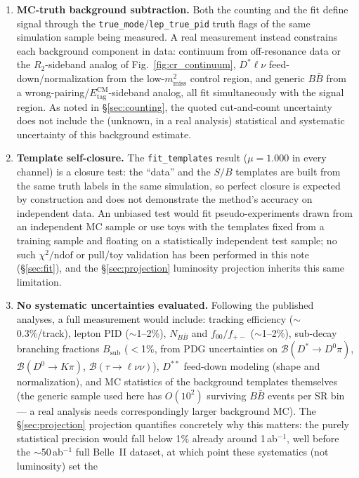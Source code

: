 \documentclass[11pt]{article}
\newcommand{\mmiss}{m^2_{\mathrm{miss}}}
\newcommand{\BF}{\mathcal{B}}
\newcommand{\Etag}{E_{\mathrm{tag}}^{\mathrm{CM}}}
\begin{document}
\begin{enumerate}
\item \textbf{MC-truth background subtraction.} Both the counting and the
  fit define signal through the
  \texttt{true\_mode}/\texttt{lep\_true\_pid} truth flags of the same
  simulation sample being measured. A real measurement instead constrains
  each background component in data: continuum from off-resonance data or
  the $R_2$-sideband analog of Fig.~\ref{fig:cr_continuum},
  $D^{*}\ell\nu$ feed-down/normalization from the low-$\mmiss$ control
  region, and generic $B\bar B$ from a wrong-pairing/$\Etag$-sideband
  analog, all fit simultaneously with the signal region. As noted in
  \S\ref{sec:counting}, the quoted cut-and-count uncertainty does not
  include the (unknown, in a real analysis) statistical and systematic
  uncertainty of this background estimate.
\item \textbf{Template self-closure.} The \texttt{fit\_templates} result
  ($\mu = 1.000$ in every channel) is a closure test: the ``data'' and
  the $S/B$ templates are built from the same truth labels in the same
  simulation, so perfect closure is expected by construction and does not
  demonstrate the method's accuracy on independent data. An unbiased test
  would fit pseudo-experiments drawn from an independent MC sample or use
  toys with the templates fixed from a training sample and floating on a
  statistically independent test sample; no such $\chi^2/\mathrm{ndof}$
  or pull/toy validation has been performed in this note
  (\S\ref{sec:fit}), and the \S\ref{sec:projection} luminosity projection
  inherits this same limitation.
\item \textbf{No systematic uncertainties evaluated.} Following the
  published analyses, a full measurement would include: tracking
  efficiency ($\sim$0.3\%/track), lepton PID ($\sim$1--2\%),
  $N_{B\bar B}$ and $f_{00}/f_{+-}$ ($\sim$1--2\%), sub-decay branching
  fractions $B_{\mathrm{sub}}$ ($<$1\%, from PDG uncertainties on
  $\BF(D^{*}\to D^0\pi)$, $\BF(D^0\to K\pi)$, $\BF(\tau\to\ell\nu\nu)$),
  $D^{**}$ feed-down modeling (shape and normalization), and MC
  statistics of the background templates themselves (the generic sample
  used here has $O(10^2)$ surviving $B\bar B$ events per SR bin --- a
  real analysis needs correspondingly larger background MC). The
  \S\ref{sec:projection} projection quantifies concretely why this
  matters: the purely statistical precision would fall below 1\% already
  around 1\,ab$^{-1}$, well before the $\sim$50\,ab$^{-1}$ full Belle~II
  dataset, at which point these systematics (not luminosity) set the

\end{enumerate}
\end{document}
